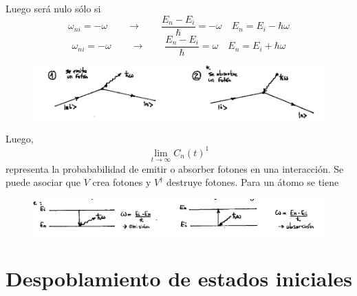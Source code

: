 \documentclass[10pt,oneside]{CBFT_book}
\begin{document}
Luego será nulo sólo si 
\[
	\omega_{ni} = -\omega \qquad \longrightarrow \qquad 
		\frac{E_n - E_i}{\hbar} = -\omega \quad E_n = E_i - \hbar\omega
\]
\[
	\omega_{ni} = -\omega \qquad \longrightarrow \qquad 
		\frac{E_n - E_i}{\hbar} = \omega \quad E_n = E_i + \hbar\omega
\]

\begin{figure}[htb]
	\begin{center}
	\includegraphics[width=1.0\textwidth]{images/teo2_25.pdf}
	\end{center}
	\caption{}
\end{figure} 

Luego,
\[
	\lim_{t\to\infty} C_n(t)^1
\]
representa la probababilidad de emitir o absorber fotones en una interacción. Se puede asociar que $V$ crea 
fotones y $V^\dagger$ destruye fotones. Para un átomo se tiene 
\begin{figure}[htb]
	\begin{center}
	\includegraphics[width=1.0\textwidth]{images/teo2_26.pdf}
	\end{center}
	\caption{}
\end{figure} 




\section{Despoblamiento de estados iniciales}
\end{document}
